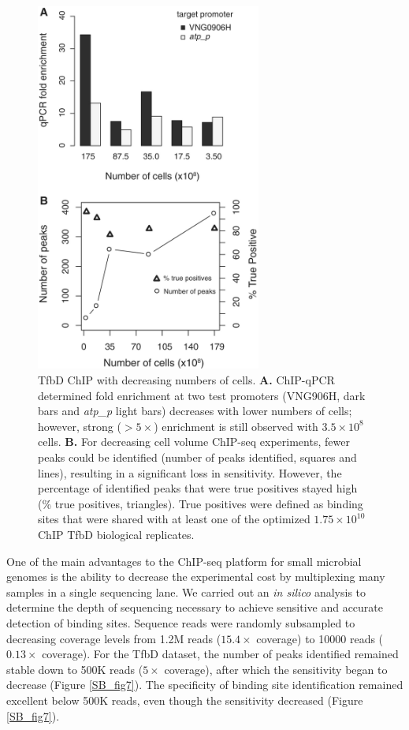 \begin{figure}
\centering
\includegraphics[width=20em]{SaltyBugs/figures/fig6}
\caption{TfbD ChIP with decreasing numbers of cells. \textbf{A.} ChIP-qPCR determined fold enrichment at two test promoters (VNG906H, dark bars and {\em atp\_p} light bars) decreases with lower numbers of cells; however, strong ($>5\times$) enrichment is still observed with $3.5 \times 10^8$ cells. \textbf{B.} For decreasing cell volume ChIP-seq experiments, fewer peaks could be identified (number of peaks identified, squares and lines), resulting in a significant loss in sensitivity. However, the percentage of identified peaks that were true positives stayed high (\% true positives, triangles). True positives were defined as binding sites that were shared with at least one of the optimized $1.75 \times 10^{10}$ ChIP TfbD biological replicates.}
\label{SB_fig6}
\end{figure}

One of the main advantages to the ChIP-seq platform for small microbial genomes is the ability to decrease the experimental cost by multiplexing many samples in a single sequencing lane. We carried out an {\em in silico} analysis to determine the depth of sequencing necessary to achieve sensitive and accurate detection of binding sites. Sequence reads were randomly subsampled to decreasing coverage levels from 1.2M reads ($15.4\times$ coverage) to 10000 reads ($0.13\times$ coverage). For the TfbD dataset, the number of peaks identified remained stable down to 500K reads ($5\times$ coverage), after which the sensitivity began to decrease (Figure \ref{SB_fig7}). The specificity of binding site identification remained excellent below 500K reads, even though the sensitivity decreased (Figure \ref{SB_fig7}).

